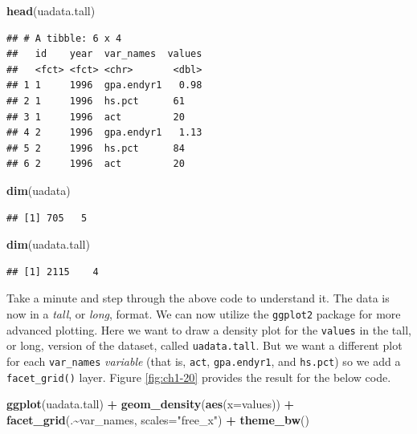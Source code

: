 \documentclass[
]{book}
\newenvironment{Shaded}{\begin{snugshade}}{\end{snugshade}}
\newcommand{\AttributeTok}[1]{\textcolor[rgb]{0.13,0.29,0.53}{#1}}
\newcommand{\FunctionTok}[1]{\textcolor[rgb]{0.13,0.29,0.53}{\textbf{#1}}}
\newcommand{\NormalTok}[1]{#1}
\newcommand{\SpecialCharTok}[1]{\textcolor[rgb]{0.81,0.36,0.00}{\textbf{#1}}}
\newcommand{\StringTok}[1]{\textcolor[rgb]{0.31,0.60,0.02}{#1}}
\begin{document}
\begin{Shaded}
\begin{Highlighting}[]
\FunctionTok{head}\NormalTok{(uadata.tall)}
\end{Highlighting}
\end{Shaded}

\begin{verbatim}
## # A tibble: 6 x 4
##   id    year  var_names  values
##   <fct> <fct> <chr>       <dbl>
## 1 1     1996  gpa.endyr1   0.98
## 2 1     1996  hs.pct      61   
## 3 1     1996  act         20   
## 4 2     1996  gpa.endyr1   1.13
## 5 2     1996  hs.pct      84   
## 6 2     1996  act         20
\end{verbatim}

\begin{Shaded}
\begin{Highlighting}[]
\FunctionTok{dim}\NormalTok{(uadata)}
\end{Highlighting}
\end{Shaded}

\begin{verbatim}
## [1] 705   5
\end{verbatim}

\begin{Shaded}
\begin{Highlighting}[]
\FunctionTok{dim}\NormalTok{(uadata.tall)}
\end{Highlighting}
\end{Shaded}

\begin{verbatim}
## [1] 2115    4
\end{verbatim}

Take a minute and step through the above code to understand it.
The data is now in a \emph{tall}, or \emph{long}, format.
We can now utilize the \texttt{ggplot2} package for more advanced plotting.
Here we want to draw a density plot for the \texttt{values} in the tall, or long, version of the dataset, called \texttt{uadata.tall}.
But we want a different plot for each \texttt{var\_names} \emph{variable} (that is, \texttt{act}, \texttt{gpa.endyr1}, and \texttt{hs.pct}) so we add a \texttt{facet\_grid()} layer.
Figure \ref{fig:ch1-20} provides the result for the below code.

\begin{Shaded}
\begin{Highlighting}[]
\FunctionTok{ggplot}\NormalTok{(uadata.tall) }\SpecialCharTok{+}
  \FunctionTok{geom\_density}\NormalTok{(}\FunctionTok{aes}\NormalTok{(}\AttributeTok{x=}\NormalTok{values)) }\SpecialCharTok{+} 
  \FunctionTok{facet\_grid}\NormalTok{(.}\SpecialCharTok{\textasciitilde{}}\NormalTok{var\_names, }\AttributeTok{scales=}\StringTok{"free\_x"}\NormalTok{) }\SpecialCharTok{+} 
  \FunctionTok{theme\_bw}\NormalTok{()}
\end{Highlighting}
\end{Shaded}
\end{document}
